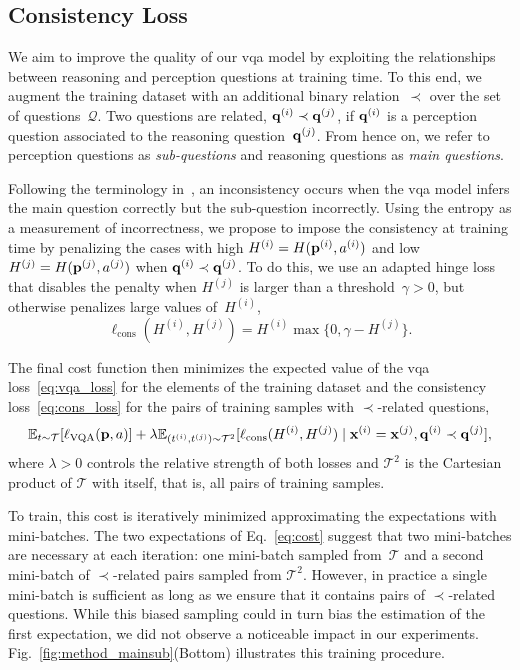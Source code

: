 \subsection{Consistency Loss} We aim to improve the quality of our \gls{vqa} model by exploiting the relationships between reasoning and perception questions at training time. To this end, we augment the training dataset with an additional binary relation~$\prec$ over the set of questions~$\mathcal{Q}$. Two questions are related, $\mathbf{q}^{(i)}\prec \mathbf{q}^{(j)}$, if $\mathbf{q}^{(i)}$ is a perception question associated to the reasoning question~$\mathbf{q}^{(j)}$. From hence on, we refer to perception questions as \emph{sub-questions} and reasoning questions as \emph{main questions}.

Following the terminology in~\cite{selvaraju2020squinting}, an inconsistency occurs when the \gls{vqa} model infers the main question correctly but the sub-question incorrectly. Using the entropy as a measurement of incorrectness, we propose to impose the consistency at training time by penalizing the cases with high $H^{(i)}=H(\mathbf{p}^{(i)}, a^{(i)})$ and low $H^{(j)}=H(\mathbf{p}^{(j)}, a^{(j)})$ when $\mathbf{q}^{(i)}\prec \mathbf{q}^{(j)}$. To do this, we use an adapted hinge loss that disables the penalty when $H^{(j)}$ is larger than a threshold~$\gamma>0$, but otherwise penalizes large values of~$H^{(i)}$,
\begin{equation}
    \label{eq:cons_loss}
    \ell_{\textrm{cons}}(H^{(i)}, H^{(j)}) = H^{(i)}\max\{0, \gamma - H^{(j)}\}.
\end{equation}
\noindent

The final cost function then minimizes the expected value of the \gls{vqa} loss~\eqref{eq:vqa_loss} for the elements of the training dataset and the consistency loss~\eqref{eq:cons_loss} for the pairs of training samples with $\prec$-related questions,
\begin{equation}
    \label{eq:cost}
    \mathbb{E}_{t\sim\mathcal{T}}[\ell_\textrm{VQA}(\mathbf{p}, a)] +
    \lambda\mathbb{E}_{(t^{(i)}, t^{(j)})\sim\mathcal{T}^2}[\ell_\textrm{cons}(H^{(i)}, H^{(j)}) \mid \mathbf{x}^{(i)}=\mathbf{x}^{(j)}, \mathbf{q}^{(i)}\prec\mathbf{q}^{(j)}],
\end{equation}
where $\lambda > 0$ controls the relative strength of both losses and $\mathcal{T}^2$ is the Cartesian product of $\mathcal{T}$ with itself, that is, all pairs of training samples.

To train, this cost is iteratively minimized approximating the expectations with mini-batches. The two expectations of Eq.~\eqref{eq:cost} suggest that two mini-batches are necessary at each iteration: one mini-batch sampled from~$\mathcal{T}$ and a second mini-batch of $\prec$-related pairs sampled from $\mathcal{T}^2$. However, in practice a single mini-batch is sufficient as long as we ensure that it contains pairs of $\prec$-related questions. While this biased sampling could in turn bias the estimation of the first expectation, we did not observe a noticeable impact in our experiments. Fig.~\ref{fig:method_mainsub}(Bottom) illustrates this training procedure.